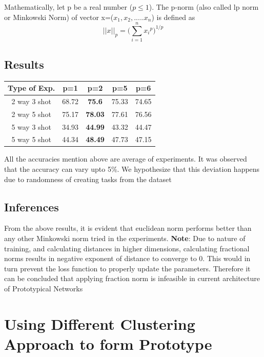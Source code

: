 Mathematically, let p be a real number (\(p\leq 1\)). The p-norm (also called lp norm or Minkowski Norm) of vector x=(\(x_1, x_2, .....x_n\)) is defined as 
\[||x||_p = \Big(\sum_{i=1}^{n} {x_i}^{p}\Big)^{1/p} \] \subsection{Results}
\begin{center}
\begin{tabular}{|c |c |c |c|c|}
\hline
Type of Exp. & p=1 & \textbf{p=2} & p=5 & p=6 \\
\hline\hline
2 way 3 shot & 68.72  & \textbf{75.6}  & 75.33 & 74.65 \\
2 way 5 shot & 75.17  &\textbf{78.03}  & 77.61 & 76.56 \\
5 way 3 shot & 34.93 &\textbf{ 44.99}  & 43.32 & 44.47  \\
5 way 5 shot & 44.34 & \textbf{48.49} & 47.73 & 47.15  \\
\hline
\end{tabular}
\end{center}
All the accuracies mention above are average of experiments. It was observed that the accuracy can vary upto 5\%. We hypothesize that this deviation happens due to randomness of creating tasks from the dataset
\subsection{Inferences}
From the above results, it is evident that euclidean norm performs better than any other Minkowski norm tried in the experiments. 
\textbf{Note}: Due to nature of training, and calculating distances in higher dimensions, calculating fractional norms results in negative exponent of distance to converge to 0. This would in turn prevent the loss function to properly update the parameters. Therefore it can be concluded that applying fraction norm is infeasible in current architecture of Prototypical Networks 
\newpage

\section{Using Different Clustering Approach to form Prototype}
